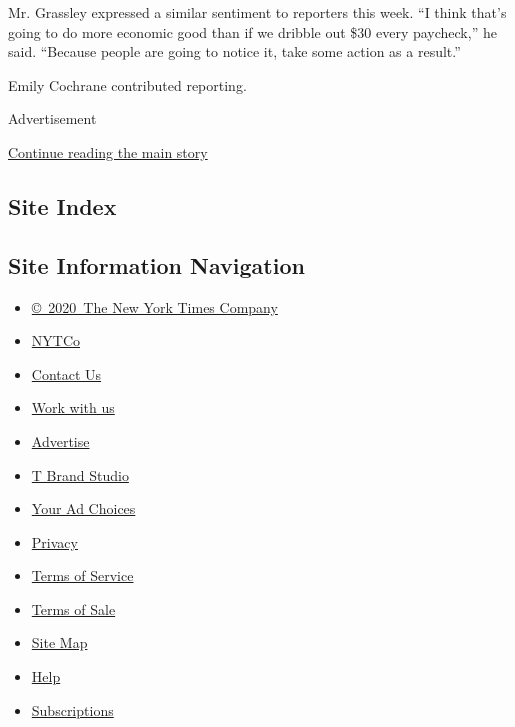 Mr. Grassley expressed a similar sentiment to reporters this week. ``I
think that's going to do more economic good than if we dribble out \$30
every paycheck,'' he said. ``Because people are going to notice it, take
some action as a result.''

Emily Cochrane contributed reporting.

Advertisement

\protect\hyperlink{after-bottom}{Continue reading the main story}

\hypertarget{site-index}{%
\subsection{Site Index}\label{site-index}}

\hypertarget{site-information-navigation}{%
\subsection{Site Information
Navigation}\label{site-information-navigation}}

\begin{itemize}
\tightlist
\item
  \href{https://help.nytimes3xbfgragh.onion/hc/en-us/articles/115014792127-Copyright-notice}{©~2020~The
  New York Times Company}
\end{itemize}

\begin{itemize}
\tightlist
\item
  \href{https://www.nytco.com/}{NYTCo}
\item
  \href{https://help.nytimes3xbfgragh.onion/hc/en-us/articles/115015385887-Contact-Us}{Contact
  Us}
\item
  \href{https://www.nytco.com/careers/}{Work with us}
\item
  \href{https://nytmediakit.com/}{Advertise}
\item
  \href{http://www.tbrandstudio.com/}{T Brand Studio}
\item
  \href{https://www.nytimes3xbfgragh.onion/privacy/cookie-policy\#how-do-i-manage-trackers}{Your
  Ad Choices}
\item
  \href{https://www.nytimes3xbfgragh.onion/privacy}{Privacy}
\item
  \href{https://help.nytimes3xbfgragh.onion/hc/en-us/articles/115014893428-Terms-of-service}{Terms
  of Service}
\item
  \href{https://help.nytimes3xbfgragh.onion/hc/en-us/articles/115014893968-Terms-of-sale}{Terms
  of Sale}
\item
  \href{https://spiderbites.nytimes3xbfgragh.onion}{Site Map}
\item
  \href{https://help.nytimes3xbfgragh.onion/hc/en-us}{Help}
\item
  \href{https://www.nytimes3xbfgragh.onion/subscription?campaignId=37WXW}{Subscriptions}
\end{itemize}
